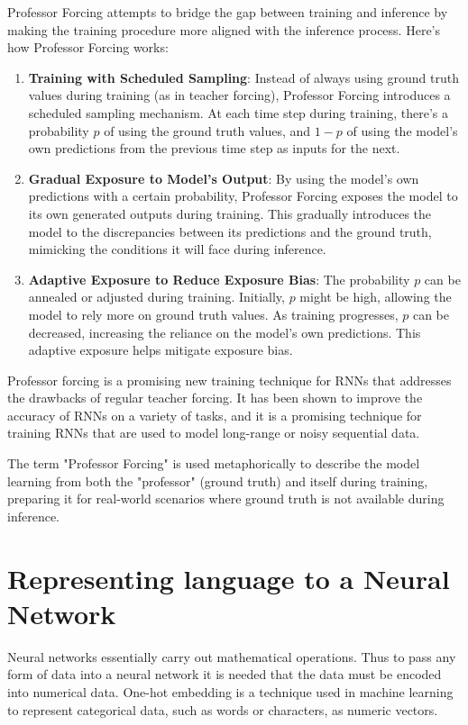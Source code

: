 \documentclass{report}
\begin{document}
Professor Forcing attempts to bridge the gap between training and inference by making the training procedure more aligned with the inference process. Here's how Professor Forcing works:
\begin{enumerate}
	\item \textbf{Training with Scheduled Sampling}: Instead of always using ground truth values during training (as in teacher forcing), Professor Forcing introduces a scheduled sampling mechanism. At each time step during training, there's a probability $p$ of using the ground truth values, and $1-p$ of using the model's own predictions from the previous time step as inputs for the next.

	\item \textbf{Gradual Exposure to Model's Output}: By using the model's own predictions with a certain probability, Professor Forcing exposes the model to its own generated outputs during training. This gradually introduces the model to the discrepancies between its predictions and the ground truth, mimicking the conditions it will face during inference.

\item \textbf{Adaptive Exposure to Reduce Exposure Bias}: The probability $p$ can be annealed or adjusted during training. Initially, $p$ might be high, allowing the model to rely more on ground truth values. As training progresses, $p$ can be decreased, increasing the reliance on the model's own predictions. This adaptive exposure helps mitigate exposure bias.
\end{enumerate}

Professor forcing is a promising new training technique for RNNs that addresses the drawbacks of regular teacher forcing. It has been shown to improve the accuracy of RNNs on a variety of tasks, and it is a promising technique for training RNNs that are used to model long-range or noisy sequential data.

The term "Professor Forcing" is used metaphorically to describe the model learning from both the "professor" (ground truth) and itself during training, preparing it for real-world scenarios where ground truth is not available during inference.

\section{Representing language to a Neural Network}
Neural networks essentially carry out mathematical operations. Thus to pass any form of data into a neural network it is needed that the data must be encoded into numerical data. One-hot embedding is a technique used in machine learning to represent categorical data, such as words or characters, as numeric vectors.
\end{document}
